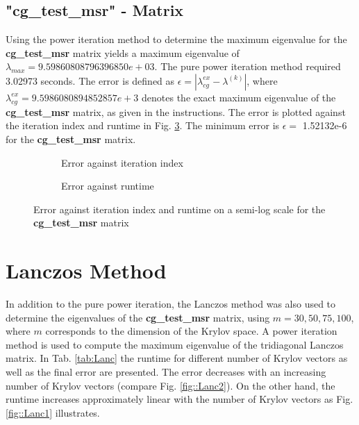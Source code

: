 \documentclass[11pt,a4paper]{article}
\newcommand{\refFig}[1]{Fig. \ref{#1}}
\newcommand{\refTab}[1]{Tab. \ref{#1}}
\begin{document}
\subsection{"{cg\_test\_msr}" - Matrix}
Using the power iteration method to determine the maximum eigenvalue for the \textbf{cg\_test\_msr} matrix yields a maximum eigenvalue of $\lambda_{max} = 9.59860808796396850e+03$. The pure power iteration method required 3.02973 seconds. The error is defined as $\epsilon = |\lambda_{cg}^{ex} - \lambda^{(k)}|$, where $\lambda_{cg}^{ex} = 9.5986080894852857e+3$ denotes the exact maximum eigenvalue of the \textbf{cg\_test\_msr} matrix, as given in the instructions. The error is plotted against the iteration index and runtime in \refFig{fig::PowerIt}. The minimum error is $\epsilon =$ 1.52132e-6 for the \textbf{cg\_test\_msr} matrix.

\begin{figure}[h!]
	\centering
	\begin{subfigure}[h!]{.49\textwidth}
		\begin{center}
			\resizebox{0.52\width}{!}{}
			\caption{Error against iteration index}
			\label{fig::Power1}
		\end{center}	
	\end{subfigure}
	\hfill
	\begin{subfigure}[h!]{.49\textwidth}
		\centering
		\resizebox{0.52\width}{!}{}
		\caption{Error against runtime}
		\label{fig::Power2}
	\end{subfigure}
	\caption{Error against iteration index and runtime on a semi-log scale for the \textbf{cg\_test\_msr} matrix}
	\label{fig::PowerIt}
\end{figure}
	
\section{Lanczos Method}
In addition to the pure power iteration, the Lanczos method was also used to determine the eigenvalues of the \textbf{cg\_test\_msr} matrix, using $m = 30,50,75,100$, where $m$ corresponds to the dimension of the Krylov space. A power iteration method is used to compute the  maximum eigenvalue of the tridiagonal Lanczos matrix. In \refTab{tab:Lanc} the runtime for different number of Krylov vectors as well as the final error are presented. The error decreases with an increasing number of Krylov vectors (compare \refFig{fig::Lanc2}). On the other hand, the runtime increases approximately linear with the number of Krylov vectors as \refFig{fig::Lanc1} illustrates. 
\end{document}
